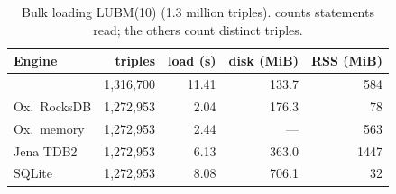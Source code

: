 \begin{table}[t]
\caption{Bulk loading LUBM(10) (1.3 million triples). \sys{} counts statements read; the others count distinct triples.}
\label{tab-load}
\small
\begin{tabular}{@{}lrrrr@{}}
\toprule
Engine & triples & load (s) & disk (MiB) & RSS (MiB) \\
\midrule
\sys{} & 1,316,700 & 11.41 & 133.7 & 584 \\
Ox.\ RocksDB & 1,272,953 & 2.04 & 176.3 & 78 \\
Ox.\ memory & 1,272,953 & 2.44 & --- & 563 \\
Jena TDB2 & 1,272,953 & 6.13 & 363.0 & 1447 \\
SQLite & 1,272,953 & 8.08 & 706.1 & 32 \\
\bottomrule
\end{tabular}
\end{table}
